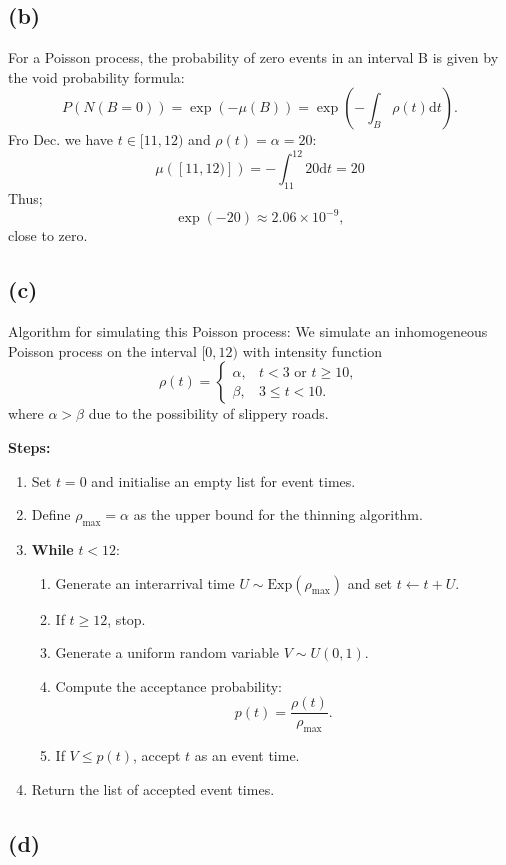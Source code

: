 \documentclass{article}
\begin{document}
\subsection*{(b)}
For a Poisson process, the probability of zero events in an interval B is given by the void probability formula:
\[
P(N(B=0))=\exp(-\mu(B))=\exp(-\int_B \rho(t)\text{d}t).
\]
Fro Dec. we have $t\in [11,12)$ and $\rho(t)=\alpha=20$:
\[
    \mu([11,12)])=-\int_{11}^{12} 20 \text{d}t=20
\]
Thus;
\[
\exp(-20)\approx 2.06\times10^{-9},
\]
close to zero.
\subsection*{(c)}
Algorithm for simulating this Poisson process:
We simulate an inhomogeneous Poisson process on the interval $[0,12)$ with intensity function  
\[
\rho(t) =
\begin{cases}
\alpha, & t < 3 \text{ or } t \geq 10, \\
\beta, & 3 \leq t < 10.
\end{cases}
\]
where $\alpha > \beta$ due to the possibility of slippery roads.

\textbf{Steps:}
\begin{enumerate}
    \item Set $t = 0$ and initialise an empty list for event times.
    \item Define $\rho_{\max} = \alpha$ as the upper bound for the thinning algorithm.
    \item \textbf{While} $t < 12$:
    \begin{enumerate}
        \item Generate an interarrival time $U \sim \text{Exp}(\rho_{\max})$ and set $t \leftarrow t + U$.
        \item If $t \geq 12$, stop.
        \item Generate a uniform random variable $V \sim U(0,1)$.
        \item Compute the acceptance probability:  
        \[
        p(t) = \frac{\rho(t)}{\rho_{\max}}.
        \]
        \item If $V \leq p(t)$, accept $t$ as an event time.
    \end{enumerate}
    \item Return the list of accepted event times.
\end{enumerate}

\subsection*{(d)}
\end{document}
